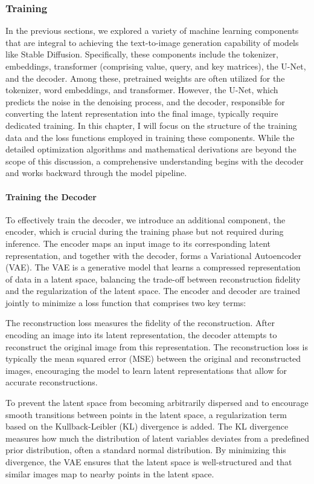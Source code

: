 \documentclass[11pt]{article}
\begin{document}
\subsubsection{Training}
\label{sec:stabel_diffusion:training}
In the previous sections, we explored a variety of machine learning components that are integral to achieving the text-to-image generation capability of models like Stable Diffusion. Specifically, these components include the tokenizer, embeddings, transformer (comprising value, query, and key matrices), the U-Net, and the decoder. Among these, pretrained weights are often utilized for the tokenizer, word embeddings, and transformer. However, the U-Net, which predicts the noise in the denoising process, and the decoder, responsible for converting the latent representation into the final image, typically require dedicated training. In this chapter, I will focus on the structure of the training data and the loss functions employed in training these components. While the detailed optimization algorithms and mathematical derivations are beyond the scope of this discussion, a comprehensive understanding begins with the decoder and works backward through the model pipeline.

\paragraph{Training the Decoder}
To effectively train the decoder, we introduce an additional component, the encoder, which is crucial during the training phase but not required during inference. The encoder maps an input image to its corresponding latent representation, and together with the decoder, forms a Variational Autoencoder (VAE)\cite{kingma2022autoencodingvariationalbayes}. The VAE is a generative model that learns a compressed representation of data in a latent space, balancing the trade-off between reconstruction fidelity and the regularization of the latent space. The encoder and decoder are trained jointly to minimize a loss function that comprises two key terms:

The reconstruction loss measures the fidelity of the reconstruction. After encoding an image into its latent representation, the decoder attempts to reconstruct the original image from this representation. The reconstruction loss is typically the mean squared error (MSE) between the original and reconstructed images, encouraging the model to learn latent representations that allow for accurate reconstructions.

To prevent the latent space from becoming arbitrarily dispersed and to encourage smooth transitions between points in the latent space, a regularization term based on the Kullback-Leibler (KL) divergence is added. The KL divergence measures how much the distribution of latent variables deviates from a predefined prior distribution, often a standard normal distribution. By minimizing this divergence, the VAE ensures that the latent space is well-structured and that similar images map to nearby points in the latent space.
\end{document}
